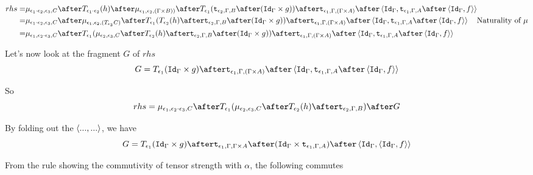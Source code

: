 \documentclass{report}
\begin{document}
    \begin{equation}
        \begin{split}
            rhs = &\bind{\e_1\dot\e_2}{\e_3}{C}\after\T{\e_1\dot\e_2}{(h)}\after\bind{\e_1}{\e_2}{(\G \times B))} \after \T{\e_1}{(\tstrength{\e_2}{\G}{B} \after (\idg \times g))} \after \tstrength{\e_1}{\G}{(\G \times A)} \after \pr{\idg}{\tstrength{\e_1}{\G}{A}\after\pr{\idg}{f}}\\
            = &\bind{\e_1\dot\e_2}{\e_3}{C}\after\bind{\e_1}{\e_2}{(\T{\e_3}{C})}\after\T{\e_1}{(\T{\e_2}{(h)} \after \tstrength{\e_2}{\G}{B} \after (\idg \times g))} \after \tstrength{\e_1}{\G}{(\G \times A)} \after \pr{\idg}{\tstrength{\e_1}{\G}{A}\after\pr{\idg}{f}}\quad\text{Naturality of $\mu$}\\
            = & \bind{\e_1}{\e_2\dot\e_3}{C}\after\T{\e_1}{(\bind{\e_2}{\e_3}{C}\after \T{\e_2}{(h)} \after \tstrength{\e_2}{\G}{B} \after (\idg \times g))} \after \tstrength{\e_1}{\G}{(\G \times A)} \after \pr{\idg}{\tstrength{\e_1}{\G}{A}\after\pr{\idg}{f}}
        \end{split}
    \end{equation}

    Let's now look at the fragment $G$ of $rhs$
    \begin{equation}
        G = \T{\e_1}{(\idg\times g)}\after\tstrength{\e_1}{\G}{(\G\times A)}\after\pr{\idg}{\tstrength{\e_1}{\G}{A}\after\pr{\idg}{f}}
    \end{equation}

    So
    \begin{equation}
        rhs = \bind{\e_1}{\e_2\dot\e_3}{C}\after\T{\e_1}{(\bind{\e_2}{\e_3}{C}\after \T{\e_2}{(h)} \after \tstrength{\e_2}{\G}{B})}\after G
    \end{equation}


    By folding out the $\left\langle..., ...\right\rangle$, we have
    \begin{equation}
        G = \T{\e_1}{(\idg\times g)}\after\tstrength{\e_1}{\G}{\G \times A}\after(\idg\times\tstrength{\e_1}{\G}{A})\after\pr{\idg}{\pr{\idg}{f}}
    \end{equation}

    From the rule  showing the commutivity of tensor strength with $\alpha$, the following commutes

\end{document}

